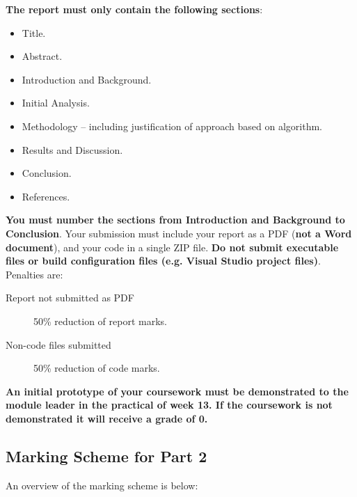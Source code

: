 \documentclass[a4paper, 12pt]{article}
\begin{document}
{\bfseries The report must only contain the following sections}:
\begin{itemize}
	\item Title.
	\item Abstract.
	\item Introduction and Background.
	\item Initial Analysis.
	\item Methodology -- including justification of approach based on algorithm.
	\item Results and Discussion.
	\item Conclusion.
	\item References.
\end{itemize}

{\bfseries You must number the sections from Introduction and Background to Conclusion}. Your submission must include your report as a PDF ({\bfseries not a Word document}), and your code in a single ZIP file. {\bfseries Do not submit executable files or build configuration files (e.g. Visual Studio project files)}.  Penalties are:

\begin{description}
	\item[Report not submitted as PDF] 50\% reduction of report marks.
	\item[Non-code files submitted] 50\% reduction of code marks.
\end{description}

{\bfseries An initial prototype of your coursework must be demonstrated to the module leader in the practical of week 13.  If the coursework is not demonstrated it will receive a grade of 0.}

\subsection*{Marking Scheme for Part 2}

An overview of the marking scheme is below:
\end{document}
